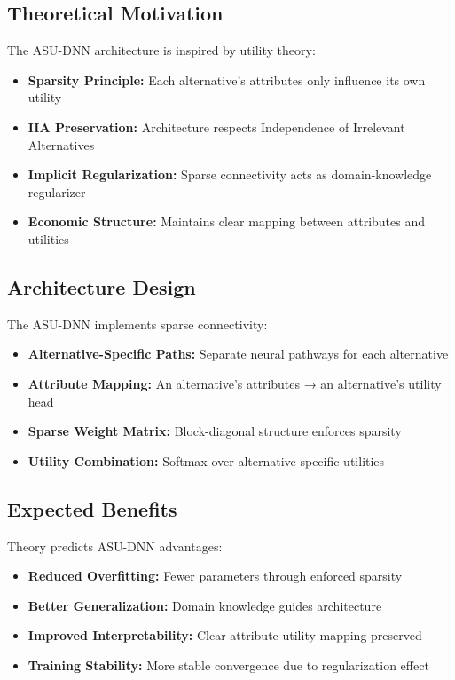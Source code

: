 \documentclass[11pt]{article}
\begin{document}
\subsection*{Theoretical Motivation}

The ASU-DNN architecture is inspired by utility theory:
\begin{itemize}
\item \textbf{Sparsity Principle:} Each alternative's attributes only influence its own utility
\item \textbf{IIA Preservation:} Architecture respects Independence of Irrelevant Alternatives
\item \textbf{Implicit Regularization:} Sparse connectivity acts as domain-knowledge regularizer
\item \textbf{Economic Structure:} Maintains clear mapping between attributes and utilities
\end{itemize}

\subsection*{Architecture Design}

The ASU-DNN implements sparse connectivity:
\begin{itemize}
\item \textbf{Alternative-Specific Paths:} Separate neural pathways for each alternative
\item \textbf{Attribute Mapping:} An alternative's attributes → an alternative's utility head
\item \textbf{Sparse Weight Matrix:} Block-diagonal structure enforces sparsity
\item \textbf{Utility Combination:} Softmax over alternative-specific utilities
\end{itemize}

\subsection*{Expected Benefits}

Theory predicts ASU-DNN advantages:
\begin{itemize}
\item \textbf{Reduced Overfitting:} Fewer parameters through enforced sparsity
\item \textbf{Better Generalization:} Domain knowledge guides architecture
\item \textbf{Improved Interpretability:} Clear attribute-utility mapping preserved
\item \textbf{Training Stability:} More stable convergence due to regularization effect
\end{itemize}
\end{document}
